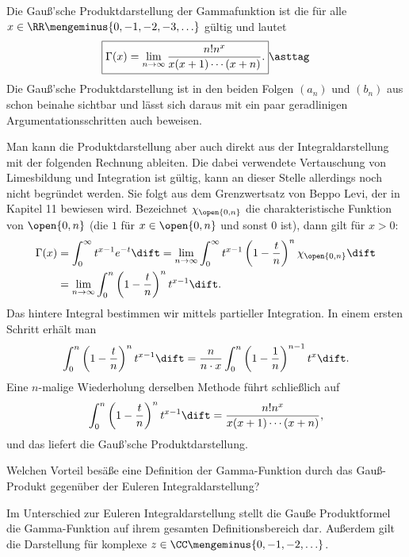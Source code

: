   \begin{antwort}
    Die Gauß'sche Produktdarstellung der Gammafunktion ist die für alle 
    $x\in\RR\mengeminus \{ 0, -1, -2, -3 ,\ldots \}$ gültig und 
    lautet  
    \begin{equation}
      \boxed{
        \Gamma(x) = \lim_{n\to\infty} 
        \frac{ n!n^x}{x(x+1)\cdots (x+n) }. 
      }
      \asttag
    \end{equation}
    Die Gauß'sche Produktdarstellung ist in den beiden Folgen 
    $(a_n)$ und $(b_n)$ aus {\astref} schon beinahe sichtbar und 
    lässt sich daraus mit ein paar geradlinigen Argumentationsschritten 
    auch beweisen. 

    Man kann die Produktdarstellung aber auch direkt 
    aus der Integraldarstellung mit der folgenden Rechnung ableiten. 
    Die dabei verwendete Vertauschung 
    von Limesbildung und Integration ist gültig, 
    kann an dieser Stelle allerdings noch nicht begründet werden. Sie folgt 
    aus dem Grenzwertsatz von Beppo Levi, der in Kapitel 11 bewiesen wird. 
    Bezeichnet $\chi_{\open{0,n}}$ die charakteristische Funktion von 
    $\open{0,n}$ (die $1$ für $x\in\open{0,n}$ und sonst $0$ ist), dann 
    gilt für $x>0$:
    \begin{align*}
      \Gamma(x) &= \int_0^\infty t^{x-1}e^{-t}\dift = 
      \lim_{n\to\infty} \int_0^\infty t^{x-1} \left(1-\frac{t}{n} \right)^n 
      \chi_{\open{0,n}} \dift \\  
      & = 
      \lim_{n\to\infty} \int_0^n \left( 1-\frac{t}{n} \right)^n t^{x-1} \dift.
    \end{align*}
    Das hintere Integral bestimmen wir mittels partieller Integration. In einem 
    ersten Schritt erhält man
    \[
    \int_0^n \left( 1-\frac{t}{n} \right)^n t^{x-1} \dift =  
    \frac{n}{n\cdot x}
    \int_0^n \left(1-\frac{1}{n}\right)^{n-1} t^x \dift.  
    \] 
    Eine $n$-malige Wiederholung derselben Methode führt schließlich auf 
    \[
    \int_0^n\left(1-\frac{t}{n} \right)^n t^{x-1} \dift 
    = \frac{ n!n^x }{ x(x+1)\cdots (x+n) },  
    \]
    und das liefert die Gauß'sche Produktdarstellung. 
    \AntEnd   
  \end{antwort}

  \begin{frage}
    Welchen Vorteil besäße eine Definition 
    der Gamma-Funktion durch das Gauß-Produkt gegenüber der 
    Euler\sch en Integraldarstellung?
  \end{frage}

  \begin{antwort}
    Im Unterschied zur Euler\sch en Integraldarstellung
    stellt die Gauß\sch e Produktformel die Gamma-Funktion 
    auf ihrem gesamten Definitionsbereich dar. Außerdem 
    gilt die Darstellung für komplexe 
    $z\in\CC\mengeminus\{ 0, -1, -2, \ldots \}$. 
    \AntEnd
  \end{antwort}


